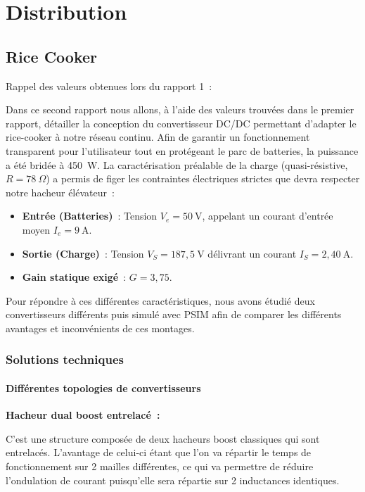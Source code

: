 \chapter{Distribution}

    \section{Rice Cooker}

Rappel des valeurs obtenues lors du rapport 1~:

Dans ce second rapport nous allons, à l'aide des valeurs trouvées dans le premier rapport, détailler la conception du convertisseur DC/DC permettant d'adapter le rice-cooker à notre réseau continu. Afin de garantir un fonctionnement transparent pour l'utilisateur tout en protégeant le parc de batteries, la puissance a été bridée à 450~W.
La caractérisation préalable de la charge (quasi-résistive, $R = 78~\Omega$) a permis de figer les contraintes électriques strictes que devra respecter notre hacheur élévateur~:

\begin{itemize}
    \item \textbf{Entrée (Batteries)}~: Tension $V_e = 50~\text{V}$, appelant un courant d'entrée moyen $I_e = 9~\text{A}$.
    \item \textbf{Sortie (Charge)}~: Tension $V_S = 187,5~\text{V}$ délivrant un courant $I_S = 2,40~\text{A}$.
    \item \textbf{Gain statique exigé}~: $G = 3,75$.
\end{itemize}

Pour répondre à ces différentes caractéristiques, nous avons étudié deux convertisseurs différents puis simulé avec PSIM afin de comparer les différents avantages et inconvénients de ces montages.

        \subsection{Solutions techniques}

\subsubsection*{Différentes topologies de convertisseurs}

\textbf{Hacheur dual boost entrelacé~:}

C'est une structure composée de deux hacheurs boost classiques qui sont entrelacés. L'avantage de celui-ci étant que l'on va répartir le temps de fonctionnement sur 2 mailles différentes, ce qui va permettre de réduire l'ondulation de courant puisqu'elle sera répartie sur 2 inductances identiques. 


